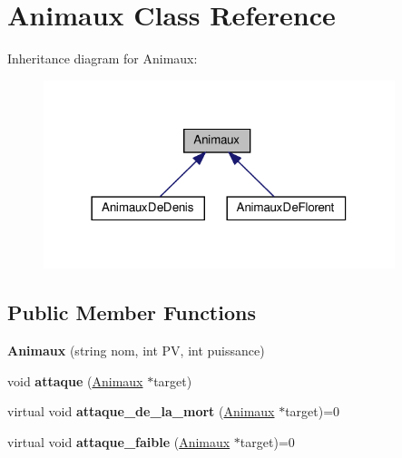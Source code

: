 \hypertarget{classAnimaux}{}\section{Animaux Class Reference}
\label{classAnimaux}


Inheritance diagram for Animaux\+:
\nopagebreak
\begin{figure}[H]
\begin{center}
\leavevmode
\includegraphics[width=290pt]{classAnimaux__inherit__graph}
\end{center}
\end{figure}
\subsection*{Public Member Functions}
\begin{DoxyCompactItemize}
\item 
\mbox{\label{classAnimaux_a773b9db3c6694b6386bf90d02df1cb30}} 
{\bfseries Animaux} (string nom, int PV, int puissance)
\item 
\mbox{\label{classAnimaux_a5d0a273721dbea9d5fde827ca32ae120}} 
void {\bfseries attaque} (\hyperlink{classAnimaux}{Animaux} $\ast$target)
\item 
\mbox{\label{classAnimaux_a9f1774b7fd8859d3fc1bcdd1ec962543}} 
virtual void {\bfseries attaque\+\_\+de\+\_\+la\+\_\+mort} (\hyperlink{classAnimaux}{Animaux} $\ast$target)=0
\item 
\mbox{\label{classAnimaux_a3a81004be25acde17fef26e3424f91cc}} 
virtual void {\bfseries attaque\+\_\+faible} (\hyperlink{classAnimaux}{Animaux} $\ast$target)=0
\end{DoxyCompactItemize}
